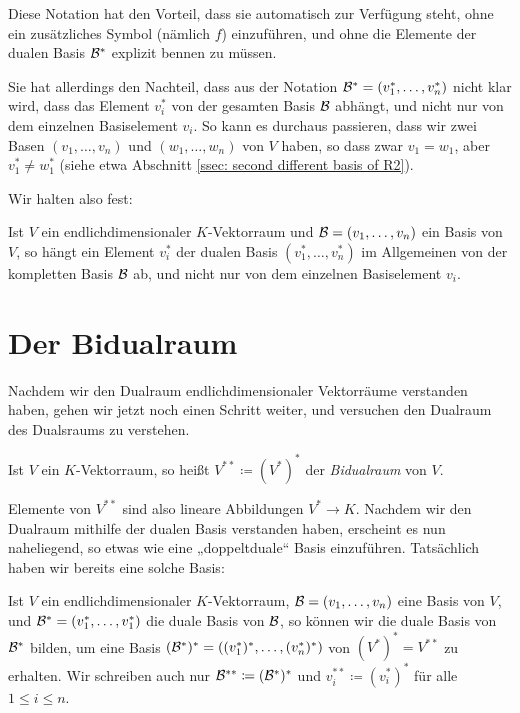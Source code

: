 \documentclass[a4paper,10pt]{article}
\begin{document}
Diese Notation hat den Vorteil, dass sie automatisch zur Verfügung steht, ohne ein zusätzliches Symbol (nämlich $f$) einzuführen, und ohne die Elemente der dualen Basis $\mathcal{B}^*$ explizit bennen zu müssen.

Sie hat allerdings den Nachteil, dass aus der Notation $\mathcal{B}^* = (v_1^*, \dotsc, v_n^*)$ nicht klar wird, dass das Element $v_i^*$ von der gesamten Basis $\mathcal{B}$ abhängt, und nicht nur von dem einzelnen Basiselement $v_i$. So kann es durchaus passieren, dass wir zwei Basen $(v_1, \dotsc, v_n)$ und $(w_1, \dotsc, w_n)$ von $V$ haben, so dass zwar $v_1 = w_1$, aber $v_1^* \neq w_1^*$ (siehe etwa Abschnitt \ref{ssec: second different basis of R2}).

Wir halten also fest:

\begin{shaded}
 Ist $V$ ein endlichdimensionaler $K$-Vektorraum und $\mathcal{B} = (v_1, \dotsc, v_n)$ ein Basis von $V$, so hängt ein Element $v_i^*$ der dualen Basis $(v_1^*, \dotsc, v_n^*)$ im Allgemeinen von der kompletten Basis $\mathcal{B}$ ab, und nicht nur von dem einzelnen Basiselement $v_i$.
\end{shaded}










\section{Der Bidualraum}
Nachdem wir den Dualraum endlichdimensionaler Vektorräume verstanden haben, gehen wir jetzt noch einen Schritt weiter, und versuchen den Dualraum des Dualsraums zu verstehen.

\begin{defi}
 Ist $V$ ein $K$-Vektorraum, so heißt $V^{**} \coloneqq (V^*)^*$ der \emph{Bidualraum} von $V$.
\end{defi}

Elemente von $V^{**}$ sind also lineare Abbildungen $V^* \to K$. Nachdem wir den Dualraum mithilfe der dualen Basis verstanden haben, erscheint es nun naheliegend, so etwas wie eine „doppeltduale“ Basis einzuführen. Tatsächlich haben wir bereits eine solche Basis:

Ist $V$ ein endlichdimensionaler $K$-Vektorraum, $\mathcal{B} = (v_1, \dotsc, v_n)$ eine Basis von $V$, und $\mathcal{B}^* = (v_1^*, \dotsc, v_1^*)$ die duale Basis von $\mathcal{B}$, so können wir die duale Basis von $\mathcal{B}^*$ bilden, um eine Basis $(\mathcal{B}^*)^* = ((v_1^*)^*, \dotsc, (v_n^*)^*)$ von $(V^*)^* = V^{**}$ zu erhalten. Wir schreiben auch nur $\mathcal{B}^{**} \coloneqq (\mathcal{B}^*)^*$ und $v_i^{**} \coloneqq (v_i^*)^*$ für alle $1 \leq i \leq n$.
\end{document}
